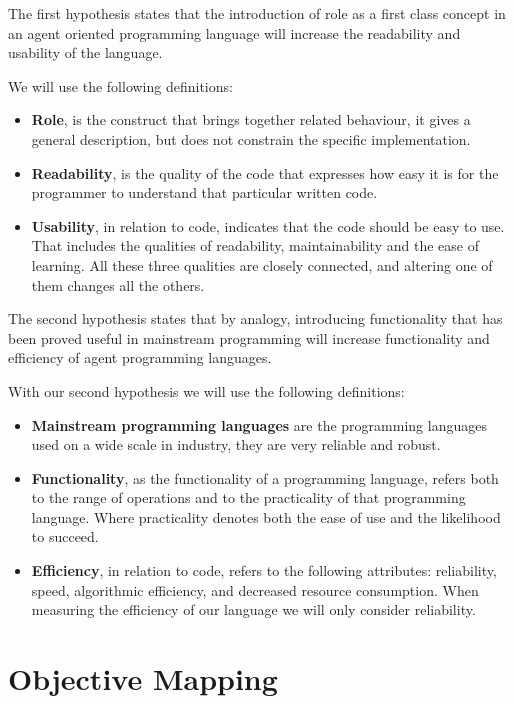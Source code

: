 \documentclass[a4paper,12pt,oneside,fleqn]{book} %
\begin{document}
The first hypothesis states that the introduction of role as a first class
concept in an agent oriented programming language will increase the
readability and usability of the language.

We will use the following definitions:
\begin{itemize}
  \item \textbf{Role}, is the construct that brings together related behaviour, 
     it gives a general description, but does not constrain the specific
     implementation.
   \item \textbf{Readability}, is the quality of the code that expresses how 
     easy it is for the programmer to understand that particular written code.
   \item \textbf{Usability}, in relation to code, indicates that the code 
     should be easy to use. That includes the qualities of readability,
     maintainability and the ease of learning. All these three qualities
     are closely connected, and altering one of them changes all the
     others.
\end{itemize}

The second hypothesis states that by analogy, introducing functionality
that has been proved useful in mainstream programming will increase
functionality and efficiency of agent programming languages.

With our second hypothesis we will use the following definitions:
\begin{itemize}
  \item \textbf{Mainstream programming languages} are the programming languages
     used on a wide scale in industry, they are very reliable and robust.
   \item \textbf{Functionality}, as the functionality of a programming language,
     refers both to the range of operations and to the practicality of
     that programming language. Where practicality denotes both the ease of
     use and the likelihood to succeed.
   \item \textbf{Efficiency}, in relation to code, refers to the following
     attributes: reliability, speed, algorithmic efficiency, and decreased
     resource consumption. When measuring the efficiency of our language we
     will only consider reliability.
\end{itemize}


\section{Objective Mapping} %
\end{document}
